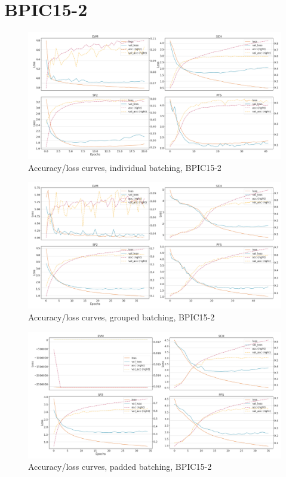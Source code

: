 \section*{BPIC15-2}
\begin{figure}[!htb]
    \centering
    \includegraphics[width=\textwidth]{gfx/bpic2015_2/individual_loss_acc_curve.png}
    \caption{Accuracy/loss curves, individual batching, BPIC15-2}
\end{figure}
\begin{figure}[!htb]
    \centering
    \includegraphics[width=\textwidth]{gfx/bpic2015_2/grouped_loss_acc_curve.png}
    \caption{Accuracy/loss curves, grouped batching, BPIC15-2}
\end{figure}
\begin{figure}[!htb]
    \centering
    \includegraphics[width=\textwidth]{gfx/bpic2015_2/padded_loss_acc_curve.png}
    \caption{Accuracy/loss curves, padded batching, BPIC15-2}
\end{figure}

